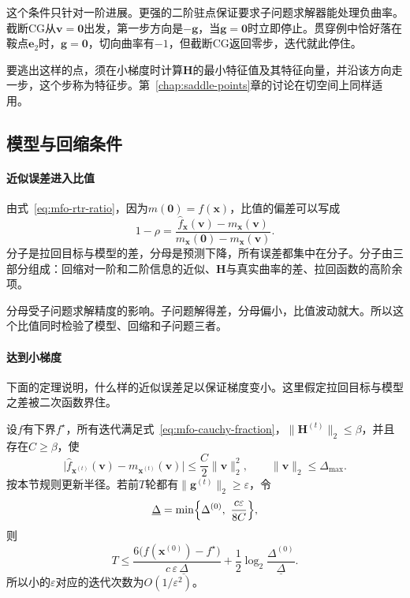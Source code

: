 这个条件只针对一阶进展。更强的二阶驻点保证要求子问题求解器能处理负曲率。截断CG从$\bm{v}=\bm{0}$出发，第一步方向是$-\bm{g}$，当$\bm{g}=\bm{0}$时立即停止。贯穿例中恰好落在鞍点$\bm{e}_2$时，$\bm{g}=\bm{0}$，切向曲率有$-1$，但截断CG返回零步，迭代就此停住。

要逃出这样的点，须在小梯度时计算$\bm{H}$的最小特征值及其特征向量，并沿该方向走一步，这个步称为特征步。第~\ref{chap:saddle-points}章的讨论在切空间上同样适用。

\subsection{模型与回缩条件}
\label{sec:mfo-rtr-conditions}

\paragraph{近似误差进入比值}
由式~\eqref{eq:mfo-rtr-ratio}，因为$m(\bm{0})=f(\bm{x})$，比值的偏差可以写成
\begin{equation}
 1-\rho=\frac{\hat{f}_{\bm{x}}(\bm{v})-m_{\bm{x}}(\bm{v})}{m_{\bm{x}}(\bm{0})-m_{\bm{x}}(\bm{v})}.
 \label{eq:mfo-rho-gap}
\end{equation}
分子是拉回目标与模型的差，分母是预测下降，所有误差都集中在分子。分子由三部分组成：回缩对一阶和二阶信息的近似、$\bm{H}$与真实曲率的差、拉回函数的高阶余项。

分母受子问题求解精度的影响。子问题解得差，分母偏小，比值波动就大。所以这个比值同时检验了模型、回缩和子问题三者。

\paragraph{达到小梯度}
下面的定理说明，什么样的近似误差足以保证梯度变小。这里假定拉回目标与模型之差被二次函数界住。

\begin{theorem}[黎曼信赖域的迭代界]
 \label{thm:mfo-rtr-complexity}
 设$f$有下界$f^\star$，所有迭代满足式~\eqref{eq:mfo-cauchy-fraction}，$\lVert\bm{H}^{(t)}\rVert_2\leq\beta$，并且存在$C\geq\beta$，使
 \begin{equation}
  \bigl\lvert\hat{f}_{\bm{x}^{(t)}}(\bm{v})-m_{\bm{x}^{(t)}}(\bm{v})\bigr\rvert\leq\frac C2\lVert\bm{v}\rVert_2^2,\qquad\lVert\bm{v}\rVert_2\leq\Delta_{\max}.
  \label{eq:mfo-model-error}
 \end{equation}
 按本节规则更新半径。若前$T$轮都有$\lVert\bm{g}^{(t)}\rVert_2\geq\varepsilon$，令
 \begin{equation}
  \underline{\Delta}=\min\Bigl\{\Delta^{(0)},\ \frac{c\varepsilon}{8C}\Bigr\},
  \label{eq:mfo-rtr-radius-floor}
 \end{equation}
 则
 \begin{equation}
  T\leq\frac{6\bigl(f(\bm{x}^{(0)})-f^\star\bigr)}{c\,\varepsilon\,\underline{\Delta}}+\frac12\log_2\frac{\Delta^{(0)}}{\underline{\Delta}}.
  \label{eq:mfo-rtr-complexity}
 \end{equation}
 所以小的$\varepsilon$对应的迭代次数为$O(1/\varepsilon^2)$。
\end{theorem}

